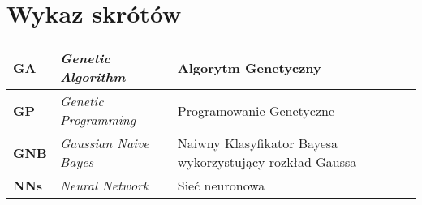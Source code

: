 \section*{Wykaz skrótów}

\begin{table}[H]
    \centering
    \begin{tabularx}{\linewidth}{l|X|X}
        \textbf{GA} & \textit{Genetic Algorithm} & Algorytm Genetyczny \\
        \hline
        \textbf{GP} & \textit{Genetic Programming} & Programowanie Genetyczne \\
        \hline
        \textbf{GNB} & \textit{Gaussian Naive Bayes} & Naiwny Klasyfikator Bayesa wykorzystujący rozkład Gaussa \\
        \hline
        \textbf{NNs} & \textit{Neural Network} & Sieć neuronowa \\
    \end{tabularx}
    \label{tab:shorts}
\end{table}